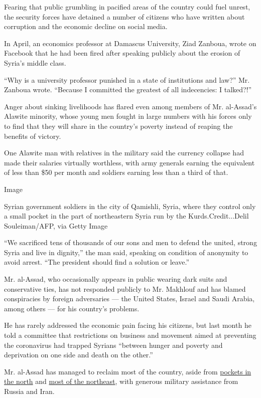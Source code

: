 Fearing that public grumbling in pacified areas of the country could
fuel unrest, the security forces have detained a number of citizens who
have written about corruption and the economic decline on social media.

In April, an economics professor at Damascus University, Ziad Zanboua,
wrote on Facebook that he had been fired after speaking publicly about
the erosion of Syria's middle class.

``Why is a university professor punished in a state of institutions and
law?'' Mr. Zanboua wrote. ``Because I committed the greatest of all
indecencies: I talked?!''

Anger about sinking livelihoods has flared even among members of Mr.
al-Assad's Alawite minority, whose young men fought in large numbers
with his forces only to find that they will share in the country's
poverty instead of reaping the benefits of victory.

One Alawite man with relatives in the military said the currency
collapse had made their salaries virtually worthless, with army generals
earning the equivalent of less than \$50 per month and soldiers earning
less than a third of that.

Image

Syrian government soldiers in the city of Qamishli, Syria, where they
control only a small pocket in the part of northeastern Syria run by the
Kurds.Credit...Delil Souleiman/AFP, via Getty Image

``We sacrificed tens of thousands of our sons and men to defend the
united, strong Syria and live in dignity,'' the man said, speaking on
condition of anonymity to avoid arrest. ``The president should find a
solution or leave.''

Mr. al-Assad, who occasionally appears in public wearing dark suits and
conservative ties, has not responded publicly to Mr. Makhlouf and has
blamed conspiracies by foreign adversaries --- the United States, Israel
and Saudi Arabia, among others --- for his country's problems.

He has rarely addressed the economic pain facing his citizens, but last
month he told a committee that restrictions on business and movement
aimed at preventing the coronavirus had trapped Syrians ``between hunger
and poverty and deprivation on one side and death on the other.''

Mr. al-Assad has managed to reclaim most of the country, aside from
\href{https://www.nytimes3xbfgragh.onion/2020/02/26/world/middleeast/syria-idlib-refugees.html}{pockets
in the north} and
\href{https://www.nytimes3xbfgragh.onion/interactive/2019/10/30/world/middleeast/syria-turkey-maps.html}{most
of the northeast}, with generous military assistance from Russia and
Iran.

